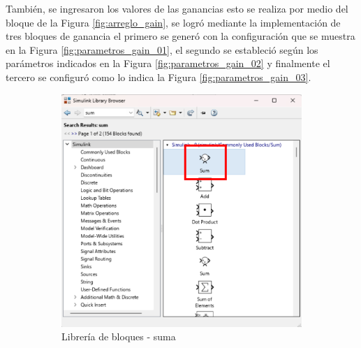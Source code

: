 También, se ingresaron los valores de las ganancias esto se realiza por medio del bloque de la Figura \ref{fig:arreglo_gain}, se logró mediante la implementación de tres bloques de ganancia el primero se generó con la configuración que se muestra en la Figura \ref{fig:parametros_gain_01}, el segundo se estableció según los parámetros indicados en la Figura \ref{fig:parametros_gain_02} y finalmente el tercero se configuró como lo indica la Figura \ref{fig:parametros_gain_03}. 

\begin{figure}[htbp]
    \centering
    \begin{subfigure}[b]{0.35\textwidth}
        \centering
        \includegraphics[width=\textwidth]{fig/Capitulo5/Caso_de_estudio_PID/lib_suma.pdf}
        \caption{Librería de bloques - suma}
        \label{fig:lib_bloques_add}
    \end{subfigure}
    \hfill
    \begin{subfigure}[b]{0.45\textwidth}
        \centering

\end{subfigure}
\end{figure}
